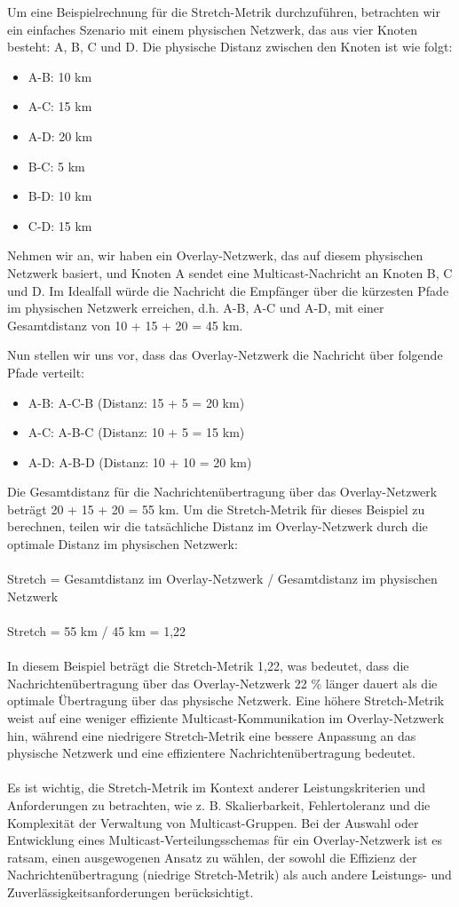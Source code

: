 \documentclass[../vs-script-first-v01.tex]{subfiles}
\begin{document}
Um eine Beispielrechnung für die Stretch-Metrik durchzuführen, betrachten wir ein einfaches Szenario mit einem physischen Netzwerk, das aus vier Knoten besteht: A, B, C und D. Die physische Distanz zwischen den Knoten ist wie folgt:
\begin{itemize} 
\item A-B: 10 km
\item A-C: 15 km
\item A-D: 20 km
\item B-C: 5 km
\item B-D: 10 km
\item C-D: 15 km
\end{itemize} 
Nehmen wir an, wir haben ein Overlay-Netzwerk, das auf diesem physischen Netzwerk basiert, und Knoten A sendet eine Multicast-Nachricht an Knoten B, C und D. Im Idealfall würde die Nachricht die Empfänger über die kürzesten Pfade im physischen Netzwerk erreichen, d.h. A-B, A-C und A-D, mit einer Gesamtdistanz von 10 + 15 + 20 = 45 km.

Nun stellen wir uns vor, dass das Overlay-Netzwerk die Nachricht über folgende Pfade verteilt:
\begin{itemize} 
\item A-B: A-C-B (Distanz: 15 + 5 = 20 km)
\item A-C: A-B-C (Distanz: 10 + 5 = 15 km)
\item A-D: A-B-D (Distanz: 10 + 10 = 20 km)
\end{itemize} 
Die Gesamtdistanz für die Nachrichtenübertragung über das Overlay-Netzwerk beträgt 20 + 15 + 20 = 55 km. Um die Stretch-Metrik für dieses Beispiel zu berechnen, teilen wir die tatsächliche Distanz im Overlay-Netzwerk durch die optimale Distanz im physischen Netzwerk:
\\\\
Stretch = Gesamtdistanz im Overlay-Netzwerk / Gesamtdistanz im physischen Netzwerk
\\\\
Stretch = 55 km / 45 km = 1,22
\\\\
In diesem Beispiel beträgt die Stretch-Metrik 1,22, was bedeutet, dass die Nachrichtenübertragung über das Overlay-Netzwerk 22 \% länger dauert als die optimale Übertragung über das physische Netzwerk. Eine höhere Stretch-Metrik weist auf eine weniger effiziente Multicast-Kommunikation im Overlay-Netzwerk hin, während eine niedrigere Stretch-Metrik eine bessere Anpassung an das physische Netzwerk und eine effizientere Nachrichtenübertragung bedeutet.
\\\\
Es ist wichtig, die Stretch-Metrik im Kontext anderer Leistungskriterien und Anforderungen zu betrachten, wie z. B. Skalierbarkeit, Fehlertoleranz und die Komplexität der Verwaltung von Multicast-Gruppen. Bei der Auswahl oder Entwicklung eines Multicast-Verteilungsschemas für ein Overlay-Netzwerk ist es ratsam, einen ausgewogenen Ansatz zu wählen, der sowohl die Effizienz der Nachrichtenübertragung (niedrige Stretch-Metrik) als auch andere Leistungs- und Zuverlässigkeitsanforderungen berücksichtigt.
\end{document}
